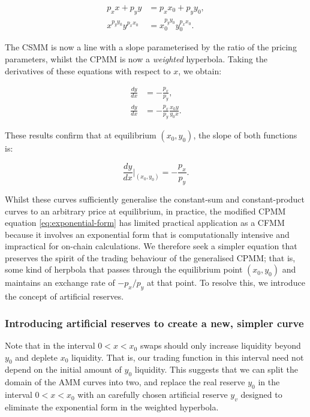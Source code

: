 \documentclass{article}
\begin{document}
\begin{align}
    \label{eq:weighted-line}
    p_x x + p_y y &= p_x x_0 + p_y y_0, \\
    \label{eq:exponential-form}
    x^{p_y y_0} y^{p_x x_0} &= x_0^{p_y y_0} y_0^{p_x x_0}.
\end{align}

The CSMM is now a line with a slope parameterised by the ratio of the pricing parameters, whilst the CPMM is now a \textit{weighted} hyperbola. Taking the derivatives of these equations with respect to $x$, we obtain:

\begin{align}
    \frac{dy}{dx} &= -\frac{p_x}{p_y}, \\
    \frac{dy}{dx} &= -\frac{p_x}{p_y} \frac{x_0 y}{y_0 x}.
\end{align}

These results confirm that at equilibrium $(x_0, y_0)$, the slope of both functions is:

\[
\frac{dy}{dx} \Big|_{(x_0, y_0)} = -\frac{p_x}{p_y}.
\]

Whilst these curves sufficiently generalise the constant-sum and constant-product curves to an arbitrary price at equilibrium, in practice, the modified CPMM equation \eqref{eq:exponential-form} has limited practical application as a CFMM because it involves an exponential form that is computationally intensive and impractical for on-chain calculations. We therefore seek a simpler equation that preserves the spirit of the trading behaviour of the generalised CPMM; that is, some kind of herpbola that passes through the equilibrium point $(x_0, y_0)$ and maintains an exchange rate of $-p_x / p_y$ at that point. To resolve this, we introduce the concept of artificial reserves.

\subsubsection{Introducing artificial reserves to create a new, simpler curve}

Note that in the interval $0 < x < x_0$ swaps should only increase liquidity beyond $y_0$ and deplete $x_0$ liquidity. That is, our trading function in this interval need not depend on the initial amount of $y_0$ liquidity. This suggests that we can split the domain of the AMM curves into two, and replace the real reserve $y_0$ in the interval $0 < x < x_0$ with an carefully chosen artificial reserve $y_v$ designed to eliminate the exponential form in the weighted hyperbola. 
\end{document}
